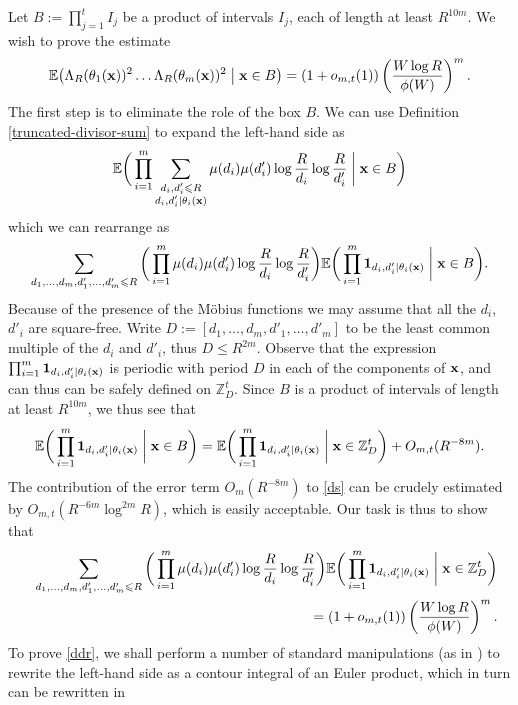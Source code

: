 \documentclass[12pt,a4paper,reqno]{amsart}
\numberwithin{equation}{section}
\theoremstyle{plain}
\theoremstyle{definition}
\renewcommand{\leq}{\leqslant}
\def\Z{{\mathbb Z}}
\def\E{{\mathbb E}}
\def\x{{\bf x}}
\def\ni{\noindent}
\begin{document}
\ni Let $B := \prod_{j = 1}^t I_j$ be a product of intervals $I_j$, each of length at least $R^{10m}$.
We wish to prove the estimate
\[ \E\big( \Lambda_R(\theta_1(\mathbf{x}))^2 \dots \Lambda_R(\theta_m(\mathbf{x}))^2 \; \big| \; \x \in B \big) = (1 + o_{m,t}(1)) 
\left( \frac{W \log R}{\phi(W)} \right)^m.
\]
The first step is to eliminate the role of the box $B$.  We can 
use Definition \ref{truncated-divisor-sum} to expand the left-hand side as
\[ \E \bigg(\prod_{i=1}^m \sum_{\substack{d_i,d'_i \leq R \\ d_i, d'_i | \theta_i(\x)}}
\mu(d_i) \mu(d'_i) \log \frac{R}{d_i} \log \frac{R}{d'_i} \; \bigg| \; \x \in B \bigg)\]
which we can rearrange as
\begin{equation}\label{ds}
 \sum_{d_1,\ldots,d_m,d'_1,\ldots,d'_m \leq R}
\bigg(\prod_{i=1}^m \mu(d_i) \mu(d'_i) \log \frac{R}{d_i} \log \frac{R}{d'_i}\bigg)
\E\bigg( \prod_{i=1}^m {\bf 1}_{d_i, d'_i | \theta_i(\x)} \; \bigg| \; \x \in B \bigg).
\end{equation}
Because of the presence of the M\"obius functions we may assume that all the $d_i$, $d'_i$ are square-free.
Write $D := [d_1,\ldots,d_m,d'_1,\ldots,d'_m]$ to be the least common multiple of the $d_i$ and $d'_i$, thus
$D \leq R^{2m}$.
Observe that the expression $\prod_{i=1}^m {\bf 1}_{d_i, d'_i | \theta_i(\x)}$ 
is periodic with period $D$ in each of the components of $\x$, and can thus can be safely defined on $\Z_D^t$.  
Since $B$ is a product of intervals of length at least $R^{10m}$, we thus see that
$$ \E\bigg( \prod_{i=1}^m {\bf 1}_{d_i, d'_i | \theta_i(\x)} \; \bigg| \; \x \in B \bigg)
= \E\bigg( \prod_{i=1}^m {\bf 1}_{d_i, d'_i | \theta_i(\x)} \; \bigg| \; \x \in \Z_D^t \bigg) + O_{m,t}(R^{-8m}).$$
The contribution of the error term $O_m(R^{-8m})$ to \eqref{ds} can be crudely estimated by $O_{m,t}(R^{-6m} \log^{2m} R)$, which
is easily acceptable.    Our task is thus to show that
\begin{eqnarray}\nonumber
 && \sum_{d_1,\ldots,d_m,d'_1,\ldots,d'_m \leq R}
\bigg(\prod_{i=1}^m \mu(d_i) \mu(d'_i) \log \frac{R}{d_i} \log \frac{R}{d'_i}\bigg)
\E\bigg( \prod_{i=1}^m {\bf 1}_{d_i, d'_i | \theta_i(\x)} \; \bigg| \; \x \in \Z_D^t \bigg)\\
&& \qquad\qquad \qquad\qquad= (1 + o_{m,t}(1))
\left( \frac{W \log R}{\phi(W)} \right)^m.\label{ddr}
\end{eqnarray}
To prove \eqref{ddr}, we shall perform a number of standard manipulations (as in \cite{goldston-yildirim}) to rewrite
the left-hand side as a contour integral of an Euler product, which in turn can be rewritten in
\end{document}
